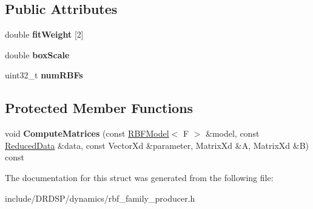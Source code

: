 \subsection*{Public Attributes}
\begin{DoxyCompactItemize}
\item 
\hypertarget{struct_d_r_d_s_p_1_1_r_b_f_family_producer_a80e649c8308fc4249acf9a91e91dbe1e}{double {\bfseries fit\-Weight} \mbox{[}2\mbox{]}}\label{struct_d_r_d_s_p_1_1_r_b_f_family_producer_a80e649c8308fc4249acf9a91e91dbe1e}

\item 
\hypertarget{struct_d_r_d_s_p_1_1_r_b_f_family_producer_a83431f5c3b6616def3277dbc57fe412b}{double {\bfseries box\-Scale}}\label{struct_d_r_d_s_p_1_1_r_b_f_family_producer_a83431f5c3b6616def3277dbc57fe412b}

\item 
\hypertarget{struct_d_r_d_s_p_1_1_r_b_f_family_producer_ad65e12c9e040fba915381b0af0031b21}{uint32\-\_\-t {\bfseries num\-R\-B\-Fs}}\label{struct_d_r_d_s_p_1_1_r_b_f_family_producer_ad65e12c9e040fba915381b0af0031b21}

\end{DoxyCompactItemize}
\subsection*{Protected Member Functions}
\begin{DoxyCompactItemize}
\item 
\hypertarget{struct_d_r_d_s_p_1_1_r_b_f_family_producer_af800620ffdbf454cd8cb33c83421a01b}{void {\bfseries Compute\-Matrices} (const \hyperlink{struct_d_r_d_s_p_1_1_r_b_f_model}{R\-B\-F\-Model}$<$ F $>$ \&model, const \hyperlink{struct_d_r_d_s_p_1_1_reduced_data}{Reduced\-Data} \&data, const Vector\-Xd \&parameter, Matrix\-Xd \&A, Matrix\-Xd \&B) const }\label{struct_d_r_d_s_p_1_1_r_b_f_family_producer_af800620ffdbf454cd8cb33c83421a01b}

\end{DoxyCompactItemize}


The documentation for this struct was generated from the following file\-:\begin{DoxyCompactItemize}
\item 
include/\-D\-R\-D\-S\-P/dynamics/rbf\-\_\-family\-\_\-producer.\-h\end{DoxyCompactItemize}
